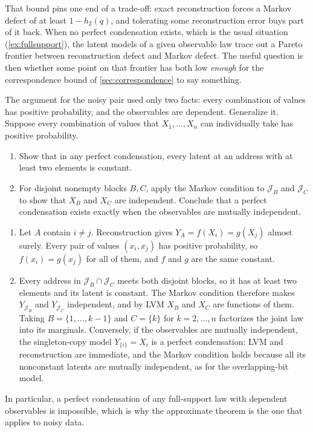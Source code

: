 \documentclass[11pt]{article}
\begin{document}
That bound pins one end of a trade-off: exact reconstruction forces a Markov
defect of at least $1-h_2(q)$, and tolerating some reconstruction error buys
part of it back. When no perfect condensation exists, which is the usual
situation (\cref{ex:fullsupport}), the latent models of a given observable law trace out a Pareto
frontier between reconstruction defect and Markov defect. The useful question
is then whether some point on that frontier has both low \emph{enough} for the
correspondence bound of \cref{sec:correspondence} to say something.

\begin{exercise}
\label{ex:fullsupport}
The argument for the noisy pair used only two facts: every combination of
values has positive probability, and the observables are dependent.
Generalize it. Suppose every combination of values that $X_1,\ldots,X_n$ can
individually take has positive probability.
\begin{enumerate}
\item Show that in any perfect condensation, every latent at an address with at
least two elements is constant.
\item For disjoint nonempty blocks $B,C$, apply the Markov condition to
$\mathcal{J}_B$ and $\mathcal{J}_C$ to show that $X_B$ and $X_C$ are
independent. Conclude that a perfect condensation exists exactly when the
observables are mutually independent.
\end{enumerate}
\end{exercise}
\begin{solution}[ex:fullsupport]
\begin{enumerate}
\item Let $A$ contain $i\ne j$. Reconstruction gives $Y_A=f(X_i)=g(X_j)$
almost surely. Every pair of values $(x_i,x_j)$ has positive probability, so
$f(x_i)=g(x_j)$ for all of them, and $f$ and $g$ are the same constant.
\item Every address in $\mathcal{J}_B\cap\mathcal{J}_C$ meets both disjoint
blocks, so it has at least two elements and its latent is constant. The Markov
condition therefore makes $Y_{\mathcal{J}_B}$ and $Y_{\mathcal{J}_C}$
independent, and by LVM $X_B$ and $X_C$ are functions of them. Taking
$B=\{1,\ldots,k-1\}$ and $C=\{k\}$ for $k=2,\ldots,n$ factorizes the joint law
into its marginals. Conversely, if the observables are mutually independent,
the singleton-copy model $Y_{\{i\}}=X_i$ is a perfect condensation: LVM and
reconstruction are immediate, and the Markov condition holds because all its
nonconstant latents are mutually independent, as for the overlapping-bit model.
\end{enumerate}
In particular, a perfect condensation of any full-support law with dependent
observables is impossible, which is why the approximate theorem is the one
that applies to noisy data.
\end{solution}
\end{document}
